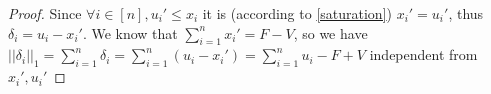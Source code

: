 \begin{proof}
   Since $\forall i \in [n],u_i' \leq x_i$ it is (according to \ref{saturation}) $x_i' = u_i'$, thus
   $\delta_i = u_i - x_i'$. We know that $\sum\limits_{i=1}^{n}x_i' = F - V$, so we have $||\delta_i||_1 =
   \sum\limits_{i=1}^{n}\delta_i = \sum\limits_{i=1}^{n}(u_i - x_i') = \sum\limits_{i=1}^{n}u_i - F + V$ independent
   from $x_i', u_i'$
\end{proof}

